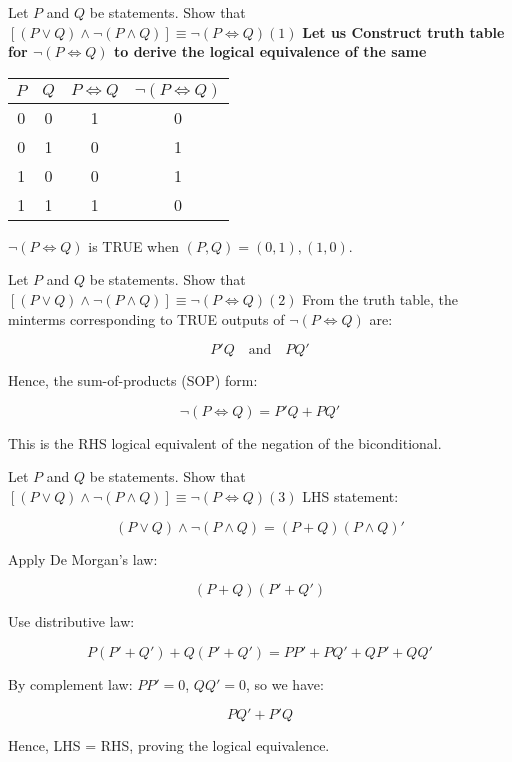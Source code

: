 \documentclass{beamer}
\begin{document}
\begin{frame}{Let $P$ and $Q$ be statements. Show that $[(P \lor Q) \land \neg(P \land Q)] \equiv \neg(P \Leftrightarrow Q)(1)$}
\textbf{Let us Construct truth table for $\neg(P \Leftrightarrow Q)$ to derive the logical equivalence of the same}

\begin{center}
\begin{tabular}{c c | c | c}
$P$ & $Q$ & $P \Leftrightarrow Q$ & $\neg(P \Leftrightarrow Q)$ \\
\hline
0 & 0 & 1 & 0 \\
0 & 1 & 0 & 1 \\
1 & 0 & 0 & 1 \\
1 & 1 & 1 & 0 \\
\end{tabular}
\end{center}

\medskip
$\neg(P \Leftrightarrow Q)$ is TRUE when $(P,Q) = (0,1), (1,0)$.
\end{frame}

\begin{frame}{Let $P$ and $Q$ be statements. Show that $[(P \lor Q) \land \neg(P \land Q)] \equiv \neg(P \Leftrightarrow Q)(2)$}
From the truth table, the minterms corresponding to TRUE outputs of $\neg(P \Leftrightarrow Q)$ are:

\[
P'Q \quad \text{and} \quad P Q'
\]

Hence, the sum-of-products (SOP) form:

\[
\neg(P \Leftrightarrow Q) = P'Q + P Q'
\]

\medskip
\alert{This is the RHS logical equivalent of the negation of the biconditional.}
\end{frame}

\begin{frame}{Let $P$ and $Q$ be statements. Show that $[(P \lor Q) \land \neg(P \land Q)] \equiv \neg(P \Leftrightarrow Q)(3)$}
LHS statement:

\[
(P \lor Q) \land \neg(P \land Q)=(P + Q)(P \land Q)'
\]

Apply De Morgan's law:

\[
(P + Q) (P' + Q')
\]

Use distributive law:

\[
P(P' + Q') + Q(P' + Q') = PP' + PQ' + QP' + QQ'
\]

By complement law: $PP'=0$, $QQ'=0$, so we have:

\[
PQ' + P'Q
\]

\medskip
\alert{Hence, LHS = RHS, proving the logical equivalence.}
\end{frame}
\end{document}
